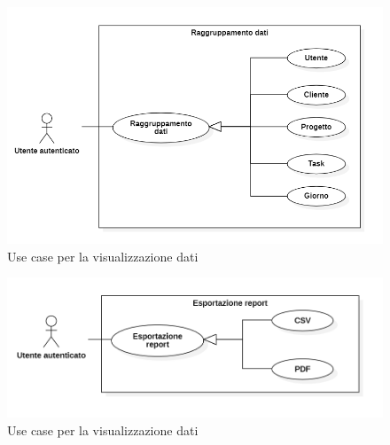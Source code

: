 \begin{figure}[bp!]
	\includegraphics[width = \textwidth*\real{0.7}]{immagini/usecase/raggruppamento_dati.png}
	\caption{Use case per la visualizzazione dati}
	\label{fig:uc_raggruppamento}
\end{figure}

\begin{figure}[bp!]
	\includegraphics[width = \textwidth*\real{0.7}]{immagini/usecase/esportazione_report.png}
	\caption{Use case per la visualizzazione dati}
	\label{fig:uc_export}
\end{figure}